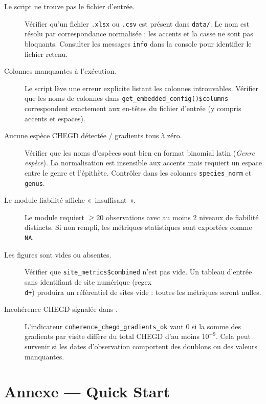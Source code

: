 \documentclass[11pt,a4paper]{article}
\begin{document}
\begin{description}
  \item[Le script ne trouve pas le fichier d'entrée.]
    Vérifier qu'un fichier \texttt{.xlsx} ou \texttt{.csv} est présent dans \texttt{data/}.
    Le nom est résolu par correspondance normalisée : les accents et la casse ne sont pas bloquants.
    Consulter les messages \texttt{info} dans la console pour identifier le fichier retenu.

  \item[Colonnes manquantes à l'exécution.]
    Le script lève une erreur explicite listant les colonnes introuvables.
    Vérifier que les noms de colonnes dans \texttt{get\_embedded\_config()\$columns} correspondent
    exactement aux en-têtes du fichier d'entrée (y compris accents et espaces).

  \item[Aucune espèce CHEGD détectée / gradients tous à zéro.]
    Vérifier que les noms d'espèces sont bien en format binomial latin (\textit{Genre espèce}).
    La normalisation est insensible aux accents mais requiert un espace entre le genre et l'épithète.
    Contrôler dans  les colonnes \texttt{species\_norm} et \texttt{genus}.

  \item[Le module fiabilité affiche «~insuffisant~».]
    Le module requiert $\geq 20$ observations avec au moins 2 niveaux de fiabilité distincts.
    Si non rempli, les métriques statistiques sont exportées comme \texttt{NA}.

  \item[Les figures sont vides ou absentes.]
    Vérifier que \texttt{site\_metrics\$combined} n'est pas vide.
    Un tableau d'entrée sans identifiant de site numérique (regex \texttt{\\d+})
    produira un référentiel de sites vide : toutes les métriques seront nulles.

  \item[Incohérence CHEGD signalée dans .]
    L'indicateur \texttt{coherence\_chegd\_gradients\_ok} vaut 0 si la somme des gradients par
    visite diffère du total CHEGD d'au moins $10^{-9}$. Cela peut survenir si les dates
    d'observation comportent des doublons ou des valeurs manquantes.
\end{description}

\section*{Annexe — Quick Start}
\end{document}
